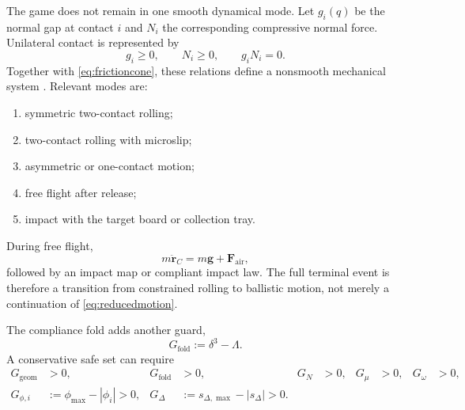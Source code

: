 \documentclass[11pt]{article}
\numberwithin{equation}{section}
\theoremstyle{definition}
\theoremstyle{remark}
\begin{document}
The game does not remain in one smooth dynamical mode.  Let $g_i(q)$ be the normal gap at contact $i$ and $N_i$ the corresponding compressive normal force.  Unilateral contact is represented by
\begin{equation}
  g_i\geq0,
  \qquad N_i\geq0,
  \qquad g_iN_i=0.
  \label{eq:complementarity}
\end{equation}
Together with \cref{eq:frictioncone}, these relations define a nonsmooth mechanical system \citep{Brogliato2016}.  Relevant modes are:
\begin{enumerate}[label=\textnormal{M\arabic*:},leftmargin=3.2em]
  \item symmetric two-contact rolling;
  \item two-contact rolling with microslip;
  \item asymmetric or one-contact motion;
  \item free flight after release;
  \item impact with the target board or collection tray.
\end{enumerate}
During free flight,
\begin{equation}
  m\ddot{\bm r}_C=m\bm g+\bm F_{\mathrm{air}},
  \label{eq:freeflight}
\end{equation}
followed by an impact map or compliant impact law.  The full terminal event is therefore a transition from constrained rolling to ballistic motion, not merely a continuation of \cref{eq:reducedmotion}.

The compliance fold adds another guard,
\begin{equation}
  G_{\mathrm{fold}}:=\delta^3-\Lambda.
  \label{eq:foldguard}
\end{equation}
A conservative safe set can require
\begin{equation}
\begin{aligned}
  G_{\mathrm{geom}}&>0, &
  G_{\mathrm{fold}}&>0, &
  G_N&>0, &
  G_\mu&>0, &
  G_\omega&>0,\\
  G_{\phi,i}&:=\phi_{\max}-|\phi_i|>0,
  &G_{\Delta}&:=s_{\Delta,\max}-|s_\Delta|>0.
\end{aligned}
  \label{eq:guards}
\end{equation}
\end{document}
